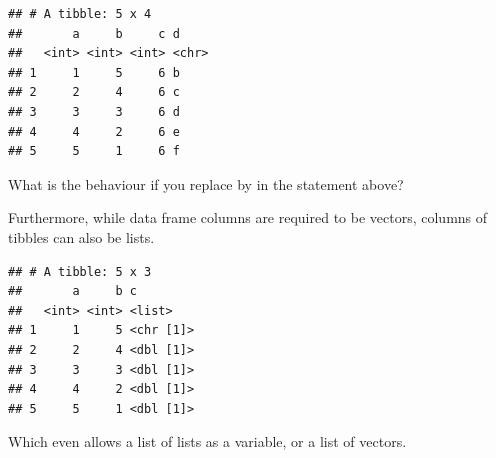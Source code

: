 \documentclass[krantz2]{krantz}\usepackage{knitr}%
\begin{document}
\begin{knitrout}\footnotesize
{}\color{fgcolor}\begin{kframe}
\begin{alltt}
\hlstd{(} \hlstd{=} \hlopt{:}\hlstd{,}  \hlstd{=} \hlopt{:}\hlstd{,}   \hlopt{+}   \hlstd{= letters[a} \hlopt{+} \hlstd{])}
\end{alltt}
\begin{verbatim}
## # A tibble: 5 x 4
##       a     b     c d    
##   <int> <int> <int> <chr>
## 1     1     5     6 b    
## 2     2     4     6 c    
## 3     3     3     6 d    
## 4     4     2     6 e    
## 5     5     1     6 f
\end{verbatim}
\end{kframe}
\end{knitrout}

\begin{playground}
What is the behaviour if you replace  by  in the statement above?
\end{playground}

Furthermore, while data frame columns are required to be vectors, columns of tibbles can also be lists.

\begin{knitrout}\footnotesize
{}\color{fgcolor}\begin{kframe}
\begin{alltt}
\hlstd{(} \hlstd{=} \hlopt{:}\hlstd{,}  \hlstd{=} \hlopt{:}\hlstd{,}  \hlstd{=} \hlstd{(}\hlstd{,} \hlstd{,} \hlstd{,} \hlstd{,} \hlstd{))}
\end{alltt}
\begin{verbatim}
## # A tibble: 5 x 3
##       a     b c        
##   <int> <int> <list>   
## 1     1     5 <chr [1]>
## 2     2     4 <dbl [1]>
## 3     3     3 <dbl [1]>
## 4     4     2 <dbl [1]>
## 5     5     1 <dbl [1]>
\end{verbatim}
\end{kframe}
\end{knitrout}

Which even allows a list of lists as a variable, or a list of vectors.
\end{document}
